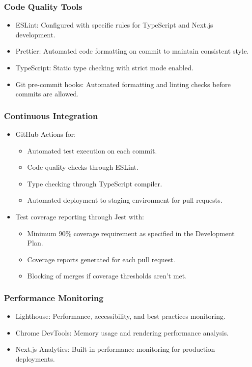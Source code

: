 \documentclass[12pt, titlepage]{article}
\begin{document}
\subsubsection*{Code Quality Tools}
\begin{itemize}
    \item ESLint: Configured with specific rules for TypeScript and Next.js development.
    \item Prettier: Automated code formatting on commit to maintain consistent style.
    \item TypeScript: Static type checking with strict mode enabled.
    \item Git pre-commit hooks: Automated formatting and linting checks before commits are allowed.
\end{itemize}

\subsubsection*{Continuous Integration}
\begin{itemize}
    \item GitHub Actions for:
    \begin{itemize}
        \item Automated test execution on each commit.
        \item Code quality checks through ESLint.
        \item Type checking through TypeScript compiler.
        \item Automated deployment to staging environment for pull requests.
    \end{itemize}
    \item Test coverage reporting through Jest with:
    \begin{itemize}
        \item Minimum 90\% coverage requirement as specified in the Development Plan.
        \item Coverage reports generated for each pull request.
        \item Blocking of merges if coverage thresholds aren't met.
    \end{itemize}
\end{itemize}

\subsubsection*{Performance Monitoring}
\begin{itemize}
    \item Lighthouse: Performance, accessibility, and best practices monitoring.
    \item Chrome DevTools: Memory usage and rendering performance analysis.
    \item Next.js Analytics: Built-in performance monitoring for production deployments.
\end{itemize}
\end{document}
